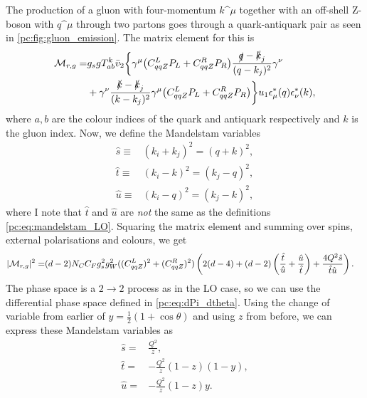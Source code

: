 \documentclass[../main.tex]{subfiles}
\begin{document}
The production of a gluon with four-momentum \(k\^\mu\) together with an off-shell Z-boson with \(q\^\mu\) through two partons goes through a quark-antiquark pair as seen in \cref{pc:fig:gluon_emission}.
The matrix element for this is
\begin{align}
  \nonumber
  \mathcal{M}_{r,g} = & g_s g T_{ab}^k \bar{v}_2 \biggl\{
  \gamma^\mu \bigl(C_{qqZ}^L P_L + C_{qqZ}^R P_R\bigr) \frac{\slashed{q}-\slashed{k}_j}{(q-k_j)^2} \gamma^\nu                \\
             & + \gamma^\nu \frac{\slashed{k}-\slashed{k}_j}{(k-k_j)^2} \gamma^\mu \bigl(C_{qqZ}^L P_L + C_{qqZ}^R P_R\bigr)
  \biggr\} u_1 \epsilon_\mu^\ast(q) \epsilon_\nu^\ast(k),
\end{align}
where \(a,b\) are the colour indices of the quark and antiquark respectively and \(k\) is the gluon index.
Now, we define the Mandelstam variables
\begin{subequations}
  \label{pc:eq:mandelstam_factorised}
  \begin{align}
    \hat{s} \equiv & (k_i+k_j)^2 = (q+k)^2, \\
    \hat{t} \equiv & (k_i-k)^2 = (k_j-q)^2, \\
    \hat{u} \equiv & (k_i-q)^2 = (k_j-k)^2,
  \end{align}
\end{subequations}
where I note that \(\hat{t}\) and \(\hat{u}\) are \emph{not} the same as the definitions \cref{pc:eq:mandelstam_LO}.
Squaring the matrix element and summing over spins, external polarisations and colours, we get
\begin{align}
  |\mathcal{M}_{r,g}|^2 = & (d-2) N_C C_F g_s^2 g_W^2 ((C_{qqZ}^L)^2 + (C_{qqZ}^R)^2) \left(2(d-4) + (d-2)\left(\frac{\hat{t}}{\hat{u}}+\frac{\hat{u}}{\hat{t}}\right) + \frac{4Q^2\hat{s}}{\hat{t}\hat{u}}\right).
\end{align}
The phase space is a \(2\to 2\) process as in the LO case, so we can use the differential phase space defined in \cref{pc:eq:dPi_dtheta}.
Using the change of variable from earlier of \(y = \frac{1}{2}(1 + \cos\theta)\) and using \(z\) from before, we can express these Mandelstam variables as
\begin{subequations}
  \begin{align}
    \hat{s} = & \frac{Q^2}{z},            \\
    \hat{t} = & -\frac{Q^2}{z}(1-z)(1-y), \\
    \hat{u} = & -\frac{Q^2}{z} (1-z)y.
  \end{align}
\end{subequations}
\end{document}
